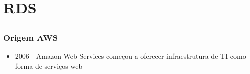 \section{RDS}

\subsection{}

\begin{frame}[allowframebreaks]
	\frametitle{Origem AWS}
	\begin{itemize}
		\item 2006 - Amazon Web Services começou a oferecer infraestrutura de TI como forma de serviços web
	\end{itemize}
\end{frame}
